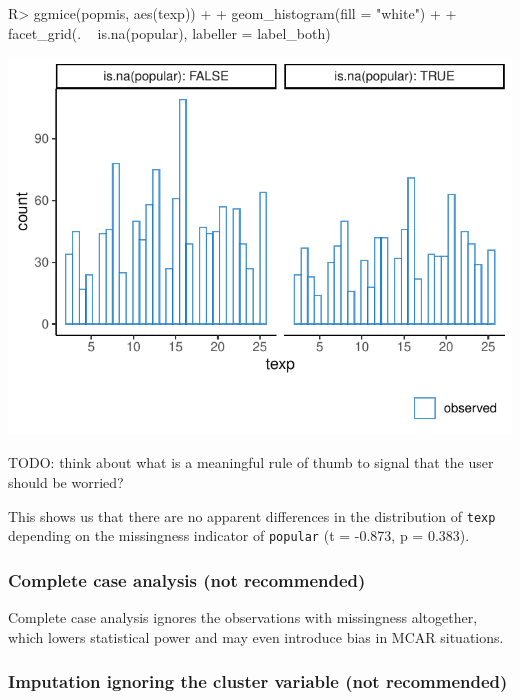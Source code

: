 \documentclass[
]{jss}
\begin{document}
\begin{CodeChunk}
\begin{CodeInput}
R> ggmice(popmis, aes(texp)) +
+   geom_histogram(fill = "white") +
+   facet_grid(. ~ is.na(popular), labeller = label_both)
\end{CodeInput}


\begin{center}\includegraphics{Imputation_of_Incomplete_Multilevel_Data_files/figure-latex/pop-hist-1} \end{center}

\end{CodeChunk}

TODO: think about what is a meaningful rule of thumb to signal that the
user should be worried?

This shows us that there are no apparent differences in the distribution
of \texttt{texp} depending on the missingness indicator of
\texttt{popular} (t = -0.873, p = 0.383).

\hypertarget{complete-case-analysis-not-recommended}{%
\subsubsection{Complete case analysis (not
recommended)}\label{complete-case-analysis-not-recommended}}

Complete case analysis ignores the observations with missingness
altogether, which lowers statistical power and may even introduce bias
in MCAR situations.

\hypertarget{imputation-ignoring-the-cluster-variable-not-recommended}{%
\subsubsection{Imputation ignoring the cluster variable (not
recommended)}\label{imputation-ignoring-the-cluster-variable-not-recommended}}
\end{document}
